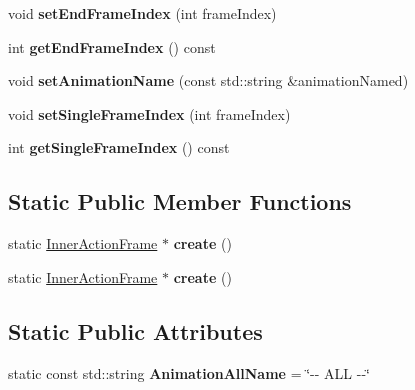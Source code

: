\begin{DoxyCompactItemize}
void {\bfseries set\+End\+Frame\+Index} (int frame\+Index)
\item 
\mbox{\label{classInnerActionFrame_a6b7d3e30b5a89e37b43fc5684d7548b5}} 
int {\bfseries get\+End\+Frame\+Index} () const
\item 
\mbox{\label{classInnerActionFrame_a9add2a73cdff02750cd9e4795a8c8b61}} 
void {\bfseries set\+Animation\+Name} (const std\+::string \&animation\+Named)
\item 
\mbox{\label{classInnerActionFrame_ab280aa0dc6e0b7dd5e301b7cebdbf86c}} 
void {\bfseries set\+Single\+Frame\+Index} (int frame\+Index)
\item 
\mbox{\label{classInnerActionFrame_adf7d5882fc2160ddeb1766e536105b60}} 
int {\bfseries get\+Single\+Frame\+Index} () const
\end{DoxyCompactItemize}
\subsection*{Static Public Member Functions}
\begin{DoxyCompactItemize}
\item 
\mbox{\label{classInnerActionFrame_af17dcaf9768362985004cb1014fa35a8}} 
static \hyperlink{classInnerActionFrame}{Inner\+Action\+Frame} $\ast$ {\bfseries create} ()
\item 
\mbox{\label{classInnerActionFrame_a955ed174c9d20c48b5fbcafc9fdf440f}} 
static \hyperlink{classInnerActionFrame}{Inner\+Action\+Frame} $\ast$ {\bfseries create} ()
\end{DoxyCompactItemize}
\subsection*{Static Public Attributes}
\begin{DoxyCompactItemize}
\item 
\mbox{\label{classInnerActionFrame_ac9be31fc5c27aaa424f38f781a5d967e}} 
static const std\+::string {\bfseries Animation\+All\+Name} = \char`\"{}-\/-\/ A\+LL -\/-\/\char`\"{}
\end{DoxyCompactItemize}
